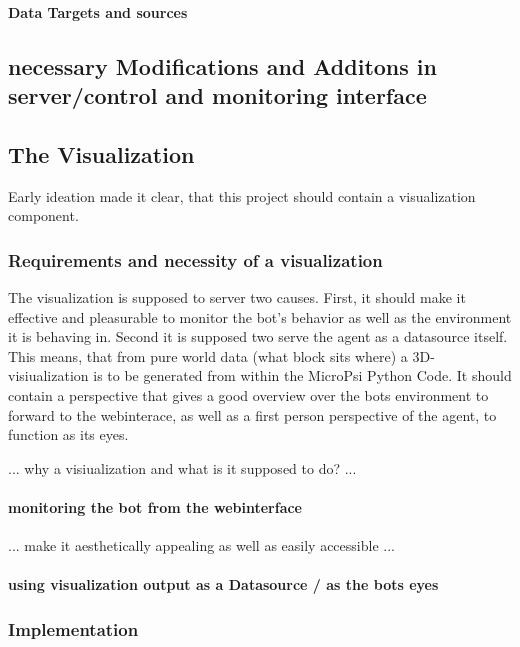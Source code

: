 \paragraph{Data Targets and sources}

\subsection{necessary Modifications and Additons in server/control and monitoring interface}

\subsection{The Visualization}
Early ideation made it clear, that this project should contain a visualization component. 

\subsubsection{Requirements and necessity of a visualization}
The visualization is supposed to server two causes. First, it should make it effective and pleasurable to monitor the bot's behavior as well as the environment it is behaving in. Second it is supposed two serve the agent as a datasource itself. This means, that from pure world data (what block sits where) a 3D-visiualization is to be generated from within the MicroPsi Python Code. It should contain a perspective that gives a good overview over the bots environment to forward to the webinterace, as well as a first person perspective of the agent, to function as its eyes.



... why a visiualization and what is it supposed to do? ...

\paragraph{monitoring the bot from the webinterface}
... make it aesthetically appealing as well as easily accessible ...

\paragraph{using visualization output as a Datasource / as the bots eyes}

\subsubsection{Implementation}


